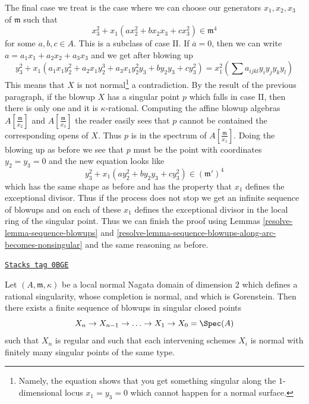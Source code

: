 \medskip\noindent
The final case we treat is the case where we can choose our generators
$x_1, x_2, x_3$ of $\mathfrak m$ such that
$$
x_3^2 + x_1(a x_2^2 + b x_2x_3 + c x_3^2) \in \mathfrak m^4
$$
for some $a, b, c \in A$. This is a subclass of case II. If
$\overline{a} = 0$, then we can write
$a = a_1 x_1 + a_2 x_2 + a_3 x_3$ and we get after blowing up
$$
y_3^2 + x_1(a_1 x_1 y_2^2 + a_2 x_1 y_2^3 + a_3 x_1 y_2^2 y_3 +
b y_2 y_3 + c y_3^2) = x_1^2 (\sum a_{ijkl}y_iy_jy_ky_l)
$$
This means that $X$ is not normal\footnote{Namely, the
equation shows that you get something singular along the
$1$-dimensional locus $x_1 = y_3 = 0$ which cannot happen
for a normal surface.} a contradiction. By the result
of the previous paragraph, if the blowup $X$
has a singular point $p$ which falls in case II, then
there is only one and it is $\kappa$-rational.
Computing the affine blowup algebras
$A[\frac{\mathfrak m}{x_2}]$ and $A[\frac{\mathfrak m}{x_3}]$
the reader easily sees that $p$ cannot be contained
the corresponding opens of $X$. Thus $p$ is in the spectrum
of $A[\frac{\mathfrak m}{x_1}]$. Doing the blowing up as before we see that
$p$ must be the point with coordinates $y_2 = y_3 = 0$ and the new
equation looks like
$$
y_3^2 + x_1(a y_2^2 + b y_2 y_3 + c y_3^2) \in (\mathfrak m')^4
$$
which has the same shape as before and has the property
that $x_1$ defines the exceptional divisor. Thus if the process
does not stop we get an infinite sequence of blowups and on
each of these $x_1$ defines the exceptional divisor in the
local ring of the singular point. Thus we can
finish the proof using
Lemmas \ref{resolve-lemma-sequence-blowups} and
\ref{resolve-lemma-sequence-blowups-along-arc-becomes-nonsingular}
and the same reasoning as before.

\begin{lemma}
\label{resolve-lemma-resolve-rational-double-points}
\href{https://stacks.math.columbia.edu/tag/0BGE}{\texttt{Stacks tag 0BGE}}

Let $(A, \mathfrak m, \kappa)$ be a local normal Nagata
domain of dimension $2$ which defines a rational singularity,
whose completion is normal, and which is Gorenstein.
Then there exists a finite sequence of blowups in
singular closed points
$$
X_n \to X_{n - 1} \to \ldots \to X_1 \to X_0 = \Spec(A)
$$
such that $X_n$ is regular and such that each intervening
schemes $X_i$ is normal with finitely many singular points
of the same type.
\end{lemma}

